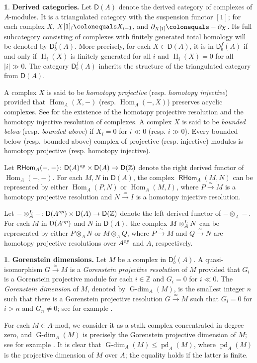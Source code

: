 \documentclass{amsart}
\DeclareMathOperator{\h}{H}
\newcommand{\Z}{\mathbb{Z}}
\newcommand{\D}{\mathsf{D}}
\newcommand{\0}{{\bf{0}}}
\DeclareMathOperator{\pd}{pd}
\DeclareMathOperator{\Gdim}{G-dim}
\DeclareMathOperator{\Hom}{Hom}
\DeclareMathOperator{\RHom}{\mathsf{RHom}}
\theoremstyle{definition}
\newtheorem{chunk}[theorem]{}
\begin{document}
\begin{chunk}
\textbf{Derived categories.} Let $\D(A)$ denote the derived category of complexes of  $A$-modules. It is a triangulated category with the suspension functor $[1]$; for each complex $X$, $X[1]_i\colonequals X_{i-1}$, and  $\partial_{X[1]}\colonequals -\partial_X$. Its full subcategory consisting of complexes with finitely generated total homology will be denoted by $\D^f_b(A)$. More precisely, for each $X\in \D(A)$, it is in $\D^f_b(A)$ if and only if $\h_i(X)$ is finitely generated for all $i$ and $\h_i(X)=0$ for all $|i|\gg 0$. The category $\D^f_b(A)$ inherits the structure of the triangulated category from $\D(A)$.

A complex $X$ is said to be \emph{homotopy projective} (resp. \emph{homotopy injective}) provided that $\Hom_A(X,-)$ (resp. $\Hom_A(-,X)$) preserves acyclic complexes. See \cite[Section 3]{Spa} for the existence of the homotopy projective resolution and the homotopy injective resolution of complexes. A complex $X$ is said to be \emph{bounded below} (resp. \emph{bounded above}) if $X_i=0$ for $i\ll 0$ (resp. $i\gg 0$). Every bounded below (resp. bounded above) complex of projective (resp. injective) modules is homotopy projective (resp. homotopy injective).

Let $\RHom_A(-,-)\colon \D(A)^{\rm op}\times \D(A)\rightarrow \D(\Z)$ denote the right derived functor of $\Hom_A(-,-)$. For each $M, N$ in $\D(A)$, the complex $\RHom_A(M, N)$ can be represented by either $\Hom_A(P,N)$ or $\Hom_A(M,I)$, where $P\xrightarrow \simeq M$ is a homotopy projective resolution and $N\xrightarrow\simeq I$ is a homotopy injective resolution.

Let $-\otimes_A^{\rm L}-\colon \D(A^{\rm op})\times \D(A)\rightarrow \D(\Z)$ denote the left derived functor of $-\otimes_A-$. For each $M$ in $\D(A^{\rm op})$ and $N$ in $\D(A)$, the complex $M\otimes_A^{\rm L}N$ can be represented by either $P\otimes_A N$ or $M\otimes_A Q$, where $P\xrightarrow \simeq M$ and $Q\xrightarrow \simeq N$ are homotopy projective resolutions over $A^{\rm op}$ and $A$, respectively.
\end{chunk}

\begin{chunk}
\textbf{Gorenstein dimensions.} Let $M$ be a complex in $\D^f_b(A)$. A quasi-isomorphism $G\xrightarrow \simeq M$ is a \emph{Gorenstein projective resolution} of $M$ provided that $G_i$ is a Gorenstein projective module for each $i\in \Z$ and  $G_{i}=0$ for $i\ll 0$. The \emph{Gorenstein dimension} of $M$, denoted by $\Gdim_A(M)$, is the smallest integer $n$ such that there is a Gorenstein projective resolution $G\xrightarrow \simeq M$ such that $G_i = 0$ for $i > n$ and $G_{n}\neq 0$; see for example \cite[Definition 2.3.2]{Chr00}.

For each $M\in A\mbox{-mod}$, we consider it as a stalk complex concentrated in degree zero, and $\Gdim_A(M)$ is precisely the Gorenstein projective dimension of $M$; see for example \cite[Definition 2.8]{Hol}. It is clear that $\Gdim_A(M)\leq \pd_A(M)$, where $\pd_A(M)$ is the projective dimension of $M$ over $A$; the equality holds if the latter is finite.
\end{chunk}
\end{document}
